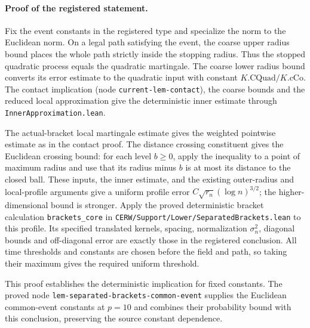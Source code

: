 \paragraph{Proof of the registered statement.}
Fix the event constants in the registered type and specialize the norm to
the Euclidean norm. On a legal path satisfying the event, the coarse upper
radius bound places the whole path strictly inside the stopping radius.
Thus the stopped quadratic process equals the quadratic martingale.
The coarse lower radius bound converts its error estimate to the quadratic
input with constant $K.\mathrm{CQuad}/K.\mathrm{cCo}$.
The contact implication (node \texttt{current-lem-contact}), the coarse bounds
and the reduced local approximation give the deterministic inner estimate
through \texttt{InnerApproximation.lean}.

The actual-bracket local martingale estimate gives the weighted pointwise
estimate as in the contact proof. The distance crossing constituent gives
the Euclidean crossing bound: for each level $b\geq0$, apply the inequality
to a point of maximum radius and use that its radius minus $b$ is at most
its distance to the closed ball. These inputs, the inner estimate, and the existing
outer-radius and local-profile arguments give a uniform profile error
$C\sqrt{r_n}(\log n)^{3/2}$; the higher-dimensional bound is stronger.
Apply the proved deterministic bracket calculation
\texttt{brackets\_core} in \texttt{CERW/Support/Lower/SeparatedBrackets.lean} to this profile.
Its specified translated kernels, spacing, normalization $\sigma_n^2$,
diagonal bounds and off-diagonal error are exactly those in the registered
conclusion. All time thresholds and constants are chosen before the field
and path, so taking their maximum gives the required uniform threshold.

This proof establishes the deterministic implication for fixed constants.
The proved node \texttt{lem-separated-brackets-common-event} supplies the
Euclidean common-event constants at $p=10$ and combines their probability
bound with this conclusion, preserving the source constant dependence.

